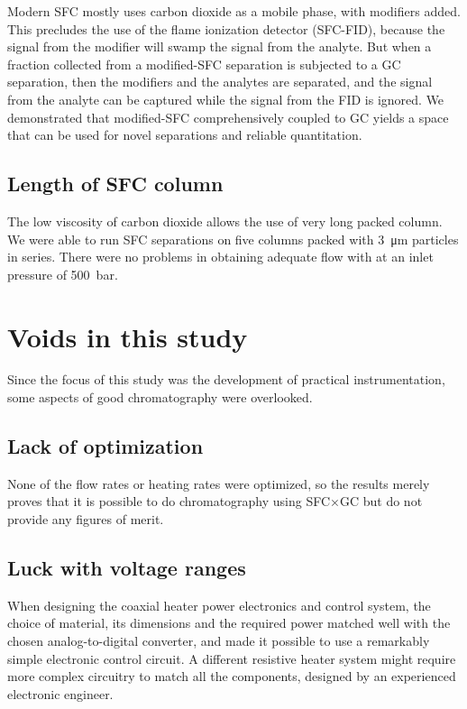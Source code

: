 Modern SFC mostly uses carbon dioxide as a mobile phase, with modifiers added.
This precludes the use of the flame ionization detector (SFC-FID), because the
signal from the modifier will swamp the signal from the analyte. But when a
fraction collected from a modified-SFC separation is subjected to a GC
separation, then the modifiers and the analytes are separated, and the signal
from the analyte can be captured while the signal from the FID is ignored. We
demonstrated that modified-SFC comprehensively coupled to GC yields a space that
can be used for novel separations and reliable quantitation.

\subsection{Length of SFC column}

The low viscosity of carbon dioxide allows the use of very long packed column.
We were able to run SFC separations on five columns packed with
\SI{3}{\micro\metre} particles in series. There were no problems in obtaining
adequate flow with at an inlet pressure of \SI{500}{\bar}.

\section{Voids in this study} 

Since the focus of this study was the development of practical instrumentation,
some aspects of good chromatography were overlooked. 

\subsection{Lack of optimization}

None of the flow rates or heating rates were optimized, so the results merely
proves that it is possible to do chromatography using SFC×GC but do not
provide any figures of merit.

\subsection{Luck with voltage ranges}

When designing the coaxial heater power electronics and control system, the
choice of material, its dimensions and the required power matched well with the
chosen analog-to-digital converter, and made it possible to use a remarkably
simple electronic control circuit. A different resistive heater system might
require more complex circuitry to match all the components, designed by an
experienced electronic engineer.

